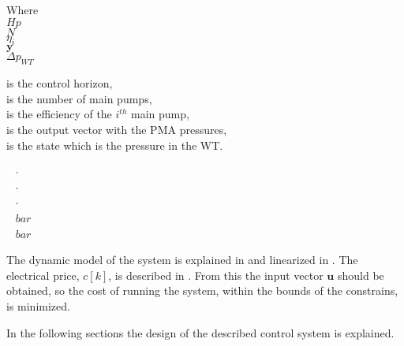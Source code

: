  \begin{minipage}[t]{0.24\textwidth}
 Where\\
 \hspace*{8mm} $Hp$ \\
 \hspace*{8mm} $N$ \\
 \hspace*{8mm} $\eta_i$ \\
 \hspace*{8mm} $\pmb{y}$ \\
 \hspace*{8mm} $\Delta p_{WT}$ 
 \end{minipage}
 \begin{minipage}[t]{0.63\textwidth}
 \vspace*{2mm}
 is the control horizon, \\
 is the number of main pumps,\\
 is the efficiency of the $i^{th}$ main pump,\\
 is the output vector with the PMA pressures,\\
 is the state which is the pressure in the WT.
 \end{minipage}
 \begin{minipage}[t]{0.10\textwidth}
 \vspace*{2mm}
 \textcolor{White}{te}$\unit{\cdot}$\\
 \textcolor{White}{te}$\unit{\cdot}$\\
 \textcolor{White}{te}$\unit{\cdot}$\\
 \textcolor{White}{te}$\unit{bar}$\\
 \textcolor{White}{te}$\unit{bar}$
 \end{minipage}

The dynamic model of the system is explained in  and linearized in . The electrical price, $c[k]$, is described in . From this the input vector $\pmb{u}$ should be obtained, so the cost of running the system, within the bounds of the constrains, is minimized. 



In the following sections the design of the described control system is explained. 





